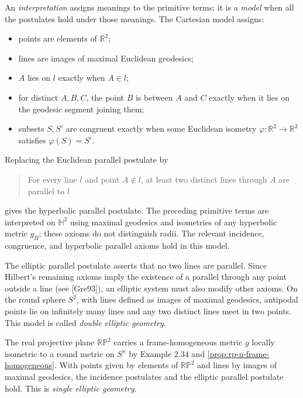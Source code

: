An \emph{interpretation} assigns meanings to the primitive terms; it is a
\emph{model} when all the postulates hold under those meanings. The Cartesian
model assigns:
\begin{itemize}
\item points are elements of $\mathbb R^2$;
\item lines are images of maximal Euclidean geodesics;
\item $A$ lies on $l$ exactly when $A\in l$;
\item for distinct $A,B,C$, the point $B$ is between $A$ and $C$ exactly when
it lies on the geodesic segment joining them;
\item subsets $S,S'$ are congruent exactly when some Euclidean isometry
$\varphi\colon\mathbb R^2\to\mathbb R^2$ satisfies $\varphi(S)=S'$.
\end{itemize}

Replacing the Euclidean parallel postulate by
\begin{quote}
For every line $l$ and point $A\notin l$, at least two distinct lines through
$A$ are parallel to $l$
\end{quote}
gives the hyperbolic parallel postulate. The preceding primitive terms are
interpreted on $\mathbb H^2$ using maximal geodesics and isometries of any
hyperbolic metric $g_B$; these axioms do not distinguish radii. The relevant
incidence, congruence, and hyperbolic parallel axioms hold in this model.

The elliptic parallel postulate asserts that no two lines are parallel. Since
Hilbert's remaining axioms imply the existence of a parallel through any point
outside a line (see [Gre93]), an elliptic system must also modify other axioms.
On the round sphere $S^2$, with lines defined as images of maximal geodesics,
antipodal points lie on infinitely many lines and any two distinct lines meet
in two points. This model is called \emph{double elliptic geometry}.

\begin{example}
\label{ex:real-projective-plane-elliptic-geometry}

The real projective plane $\mathbb{RP}^2$ carries a frame-homogeneous metric
$g$ locally isometric to a round metric on $S^n$ by Example 2.34 and
\cref{prop:rp-n-frame-homogeneous}. With points given by elements of
$\mathbb{RP}^2$ and lines by
images of maximal geodesics, the incidence postulates and the elliptic parallel
postulate hold. This is \emph{single elliptic geometry}.
\end{example}
